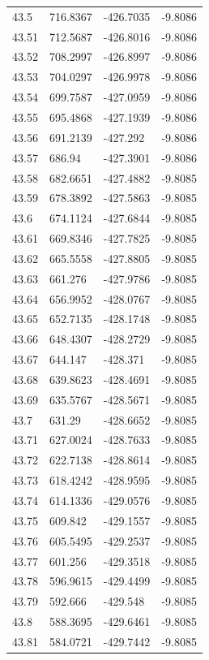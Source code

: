 \begin{table}[H]
\begin{tabular}{llll}
43.5 & 716.8367 & -426.7035 & -9.8086 \\
43.51 & 712.5687 & -426.8016 & -9.8086 \\
43.52 & 708.2997 & -426.8997 & -9.8086 \\
43.53 & 704.0297 & -426.9978 & -9.8086 \\
43.54 & 699.7587 & -427.0959 & -9.8086 \\
43.55 & 695.4868 & -427.1939 & -9.8086 \\
43.56 & 691.2139 & -427.292 & -9.8086 \\
43.57 & 686.94 & -427.3901 & -9.8086 \\
43.58 & 682.6651 & -427.4882 & -9.8085 \\
43.59 & 678.3892 & -427.5863 & -9.8085 \\
43.6 & 674.1124 & -427.6844 & -9.8085 \\
43.61 & 669.8346 & -427.7825 & -9.8085 \\
43.62 & 665.5558 & -427.8805 & -9.8085 \\
43.63 & 661.276 & -427.9786 & -9.8085 \\
43.64 & 656.9952 & -428.0767 & -9.8085 \\
43.65 & 652.7135 & -428.1748 & -9.8085 \\
43.66 & 648.4307 & -428.2729 & -9.8085 \\
43.67 & 644.147 & -428.371 & -9.8085 \\
43.68 & 639.8623 & -428.4691 & -9.8085 \\
43.69 & 635.5767 & -428.5671 & -9.8085 \\
43.7 & 631.29 & -428.6652 & -9.8085 \\
43.71 & 627.0024 & -428.7633 & -9.8085 \\
43.72 & 622.7138 & -428.8614 & -9.8085 \\
43.73 & 618.4242 & -428.9595 & -9.8085 \\
43.74 & 614.1336 & -429.0576 & -9.8085 \\
43.75 & 609.842 & -429.1557 & -9.8085 \\
43.76 & 605.5495 & -429.2537 & -9.8085 \\
43.77 & 601.256 & -429.3518 & -9.8085 \\
43.78 & 596.9615 & -429.4499 & -9.8085 \\
43.79 & 592.666 & -429.548 & -9.8085 \\
43.8 & 588.3695 & -429.6461 & -9.8085 \\
43.81 & 584.0721 & -429.7442 & -9.8085 \\

\end{tabular}
\end{table}
